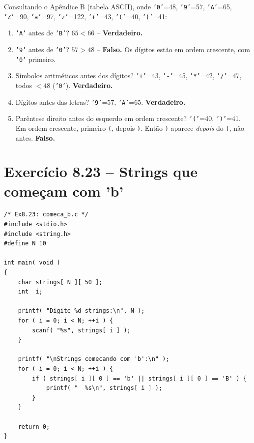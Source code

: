 \documentclass[12pt,a4paper]{article}
\begin{document}
\begin{respostabox}
Consultando o Apêndice B (tabela ASCII), onde \texttt{'0'}=48, \texttt{'9'}=57,
\texttt{'A'}=65, \texttt{'Z'}=90, \texttt{'a'}=97, \texttt{'z'}=122,
\texttt{'+'}=43, \texttt{'('}=40, \texttt{')'}=41:

\begin{enumerate}[label=\textbf{\alph*)}]

\item \texttt{'A'} antes de \texttt{'B'}? $65 < 66$ -- \textcolor{deitelgreen}{\textbf{Verdadeiro.}}

\item \texttt{'9'} antes de \texttt{'0'}? $57 > 48$ -- \textcolor{deitelred}{\textbf{Falso.}}
Os dígitos estão em ordem crescente, com \texttt{'0'} primeiro.

\item Símbolos aritméticos antes dos dígitos? \texttt{'+'}=43, \texttt{'-'}=45,
\texttt{'*'}=42, \texttt{'/'}=47, todos $< 48$ (\texttt{'0'}). \textcolor{deitelgreen}{\textbf{Verdadeiro.}}

\item Dígitos antes das letras? \texttt{'9'}=57, \texttt{'A'}=65. \textcolor{deitelgreen}{\textbf{Verdadeiro.}}

\item Parêntese direito antes do esquerdo em ordem crescente? \texttt{'('}=40,
\texttt{')'}=41. Em ordem crescente, primeiro \texttt{(}, depois \texttt{)}.
Então \texttt{)} aparece \textit{depois} do \texttt{(}, não antes.
\textcolor{deitelred}{\textbf{Falso.}}

\end{enumerate}
\end{respostabox}

\section{Exercício 8.23 -- Strings que começam com 'b'}

\begin{respostabox}
\begin{lstlisting}
/* Ex8.23: comeca_b.c */
#include <stdio.h>
#include <string.h>
#define N 10

int main( void )
{
    char strings[ N ][ 50 ];
    int  i;

    printf( "Digite %d strings:\n", N );
    for ( i = 0; i < N; ++i ) {
        scanf( "%s", strings[ i ] );
    }

    printf( "\nStrings comecando com 'b':\n" );
    for ( i = 0; i < N; ++i ) {
        if ( strings[ i ][ 0 ] == 'b' || strings[ i ][ 0 ] == 'B' ) {
            printf( "  %s\n", strings[ i ] );
        }
    }

    return 0;
}
\end{lstlisting}
\end{respostabox}
\end{document}

